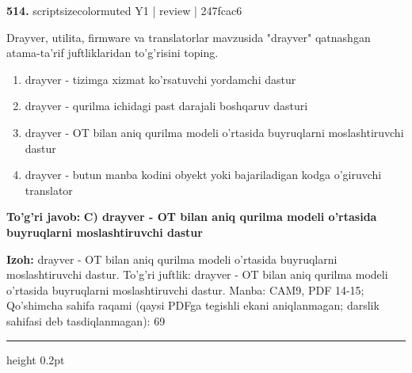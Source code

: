 \documentclass[10pt,a4paper]{article}
\begin{document}
{\bfseries\sffamily\color{ink} 514.} {scriptsizecolor{muted} Y1 | review | 247fcac6}
\par
Drayver, utilita, firmware va translatorlar mavzusida "drayver" qatnashgan atama-ta'rif juftliklaridan to'g'risini toping.
\begin{enumerate}[label=\Alph*),leftmargin=9mm]
\item drayver - tizimga xizmat ko'rsatuvchi yordamchi dastur
\item drayver - qurilma ichidagi past darajali boshqaruv dasturi
\item drayver - OT bilan aniq qurilma modeli o'rtasida buyruqlarni moslashtiruvchi dastur
\item drayver - butun manba kodini obyekt yoki bajariladigan kodga o'giruvchi translator
\end{enumerate}
\begin{tcolorbox}[enhanced,breakable,colback=teal!4,colframe=teal!60!black,boxrule=0.45pt,arc=1.2mm,left=2.7mm,right=2.7mm,top=1.8mm,bottom=1.8mm,before skip=2mm,after skip=2mm]
{\bfseries\sffamily\color{teal}To'g'ri javob:} \textbf{C) drayver - OT bilan aniq qurilma modeli o'rtasida buyruqlarni moslashtiruvchi dastur}
\par\smallskip
{\bfseries Izoh:} drayver - OT bilan aniq qurilma modeli o'rtasida buyruqlarni moslashtiruvchi dastur. To'g'ri juftlik: drayver - OT bilan aniq qurilma modeli o'rtasida buyruqlarni moslashtiruvchi dastur. Manba: CAM9, PDF 14-15; Qo'shimcha sahifa raqami (qaysi PDFga tegishli ekani aniqlanmagan; darslik sahifasi deb tasdiqlanmagan): 69
\end{tcolorbox}
\vspace{2mm}\hrule height 0.2pt\vspace{3mm}
\end{document}
